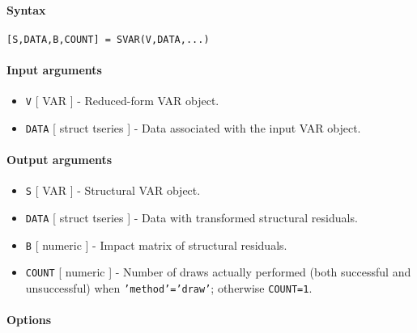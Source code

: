 


	\paragraph{Syntax}

\begin{verbatim}
[S,DATA,B,COUNT] = SVAR(V,DATA,...)
\end{verbatim}

\paragraph{Input arguments}

\begin{itemize}
\item
  \texttt{V} {[} VAR {]} - Reduced-form VAR object.
\item
  \texttt{DATA} {[} struct \textbar{} tseries {]} - Data associated with
  the input VAR object.
\end{itemize}

\paragraph{Output arguments}

\begin{itemize}
\item
  \texttt{S} {[} VAR {]} - Structural VAR object.
\item
  \texttt{DATA} {[} struct \textbar{} tseries {]} - Data with
  transformed structural residuals.
\item
  \texttt{B} {[} numeric {]} - Impact matrix of structural residuals.
\item
  \texttt{COUNT} {[} numeric {]} - Number of draws actually performed
  (both successful and unsuccessful) when \texttt{'method'='draw'};
  otherwise \texttt{COUNT=1}.
\end{itemize}

\paragraph{Options}

